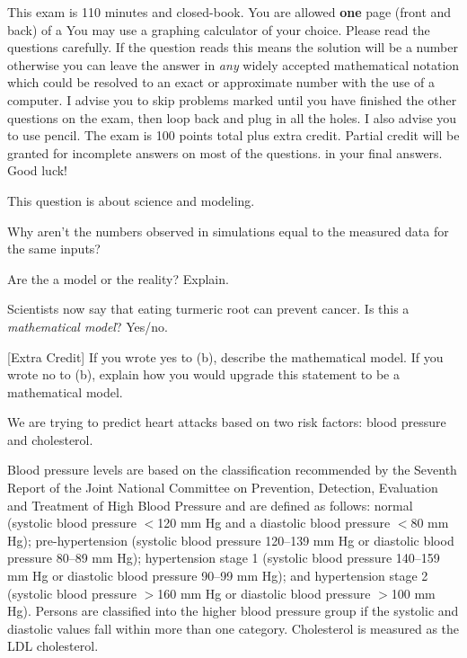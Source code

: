 \documentclass[12pt]{article}
\begin{document}
This exam is 110 minutes and closed-book. You are allowed \textbf{one} page (front and back) of a  You may use a graphing calculator of your choice. Please read the questions carefully. If the question reads  this means the solution will be a number otherwise you can leave the answer in \textit{any} widely accepted mathematical notation which could be resolved to an exact or approximate number with the use of a computer. I advise you to skip problems marked  until you have finished the other questions on the exam, then loop back and plug in all the holes. I also advise you to use pencil. The exam is 100 points total plus extra credit. Partial credit will be granted for incomplete answers on most of the questions.  in your final answers. Good luck!

\pagebreak

\problem This question is about science and modeling.

\benum

 Why aren't the numbers observed in simulations equal to the measured data for the same inputs? 

 Are the  a model or the reality? Explain. 

 Scientists now say that eating turmeric root can prevent cancer. Is this a \emph{mathematical model}? Yes/no.

 [Extra Credit] If you wrote yes to (b), describe the mathematical model. If you wrote no to (b), explain how you would upgrade this statement to be a mathematical model. 

\eenum

\problem We are trying to predict heart attacks based on two risk factors: blood pressure and cholesterol. 

Blood pressure levels are based on the classification recommended by the Seventh Report of the Joint National Committee on Prevention, Detection, Evaluation and Treatment of High Blood Pressure and are defined as follows: normal (systolic blood pressure $<$120 mm Hg and a diastolic blood pressure $<$80 mm Hg); pre-hypertension (systolic blood pressure 120--139 mm Hg or diastolic blood pressure 80--89 mm Hg); hypertension stage 1 (systolic blood pressure 140--159 mm Hg or diastolic blood pressure 90--99 mm Hg); and hypertension stage 2 (systolic blood pressure $>$160 mm Hg or diastolic blood pressure $>$100 mm Hg). Persons are classified into the higher blood pressure group if the systolic and diastolic values fall within more than one category. Cholesterol is measured as the LDL cholesterol. 
\end{document}
